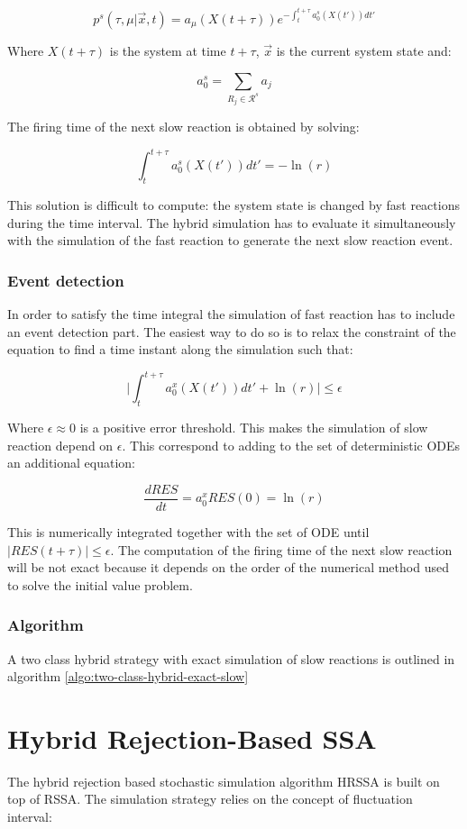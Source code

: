   $$p^s(\tau, \mu|\vec{x}, t) = a_\mu(X(t+\tau))e^{-\int_t^{t+\tau}a_0^s(X(t'))dt'}$$

  Where $X(t+\tau)$ is the system at time $t+\tau$, $\vec{x}$ is the current system state and:

  $$a_0^s = \sum\limits_{R_j\in\mathcal{R}^s}a_j$$

  The firing time of the next slow reaction is obtained by solving:

  $$\int_t^{t+\tau} a_0^s(X(t'))dt' = -\ln(r)$$

  This solution is difficult to compute: the system state is changed by fast reactions during the time interval.
  The hybrid simulation has to evaluate it simultaneously with the simulation of the fast reaction to generate the next slow reaction event.

    \subsubsection{Event detection}
    In order to satisfy the time integral the simulation of fast reaction has to include an event detection part.
    The easiest way to do so is to relax the constraint of the equation to find a time instant along the simulation such that:

    $$\biggr\vert\int_t^{t+\tau}a_0^x(X(t'))dt' + \ln(r)\biggr\vert\le\epsilon$$

    Where $\epsilon\approx 0$ is a positive error threshold.
    This makes the simulation of slow reaction depend on $\epsilon$.
    This correspond to adding to the set of deterministic ODEs an additional equation:

    $$\frac{dRES}{dt} = a_0^xRES(0) = \ln(r)$$

    This is numerically integrated together with the set of ODE until $|RES(t+\tau)|\le\epsilon$.
    The computation of the firing time of the next slow reaction will be not exact because it depends on the order of the numerical method used to solve the initial value problem.

    \subsubsection{Algorithm}
    A two class hybrid strategy with exact simulation of slow reactions is outlined in algorithm \ref{algo:two-class-hybrid-exact-slow}

    

\section{Hybrid Rejection-Based SSA}
The hybrid rejection based stochastic simulation algorithm HRSSA is built on top of RSSA.
The simulation strategy relies on the concept of fluctuation interval:

